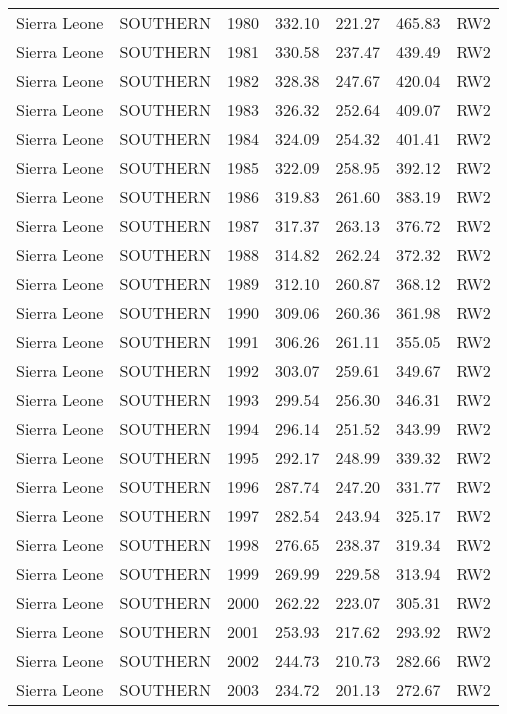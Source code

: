 \begin{longtable}{lllrrrl}
  Sierra Leone & SOUTHERN & 1980 & 332.10 & 221.27 & 465.83 & RW2 \\ 
  Sierra Leone & SOUTHERN & 1981 & 330.58 & 237.47 & 439.49 & RW2 \\ 
  Sierra Leone & SOUTHERN & 1982 & 328.38 & 247.67 & 420.04 & RW2 \\ 
  Sierra Leone & SOUTHERN & 1983 & 326.32 & 252.64 & 409.07 & RW2 \\ 
  Sierra Leone & SOUTHERN & 1984 & 324.09 & 254.32 & 401.41 & RW2 \\ 
  Sierra Leone & SOUTHERN & 1985 & 322.09 & 258.95 & 392.12 & RW2 \\ 
  Sierra Leone & SOUTHERN & 1986 & 319.83 & 261.60 & 383.19 & RW2 \\ 
  Sierra Leone & SOUTHERN & 1987 & 317.37 & 263.13 & 376.72 & RW2 \\ 
  Sierra Leone & SOUTHERN & 1988 & 314.82 & 262.24 & 372.32 & RW2 \\ 
  Sierra Leone & SOUTHERN & 1989 & 312.10 & 260.87 & 368.12 & RW2 \\ 
  Sierra Leone & SOUTHERN & 1990 & 309.06 & 260.36 & 361.98 & RW2 \\ 
  Sierra Leone & SOUTHERN & 1991 & 306.26 & 261.11 & 355.05 & RW2 \\ 
  Sierra Leone & SOUTHERN & 1992 & 303.07 & 259.61 & 349.67 & RW2 \\ 
  Sierra Leone & SOUTHERN & 1993 & 299.54 & 256.30 & 346.31 & RW2 \\ 
  Sierra Leone & SOUTHERN & 1994 & 296.14 & 251.52 & 343.99 & RW2 \\ 
  Sierra Leone & SOUTHERN & 1995 & 292.17 & 248.99 & 339.32 & RW2 \\ 
  Sierra Leone & SOUTHERN & 1996 & 287.74 & 247.20 & 331.77 & RW2 \\ 
  Sierra Leone & SOUTHERN & 1997 & 282.54 & 243.94 & 325.17 & RW2 \\ 
  Sierra Leone & SOUTHERN & 1998 & 276.65 & 238.37 & 319.34 & RW2 \\ 
  Sierra Leone & SOUTHERN & 1999 & 269.99 & 229.58 & 313.94 & RW2 \\ 
  Sierra Leone & SOUTHERN & 2000 & 262.22 & 223.07 & 305.31 & RW2 \\ 
  Sierra Leone & SOUTHERN & 2001 & 253.93 & 217.62 & 293.92 & RW2 \\ 
  Sierra Leone & SOUTHERN & 2002 & 244.73 & 210.73 & 282.66 & RW2 \\ 
  Sierra Leone & SOUTHERN & 2003 & 234.72 & 201.13 & 272.67 & RW2 \\ 

\end{longtable}

